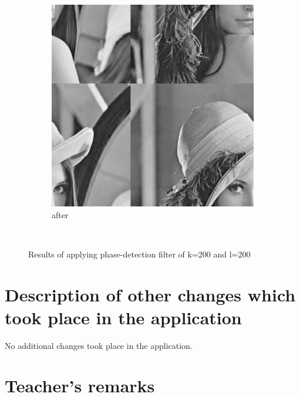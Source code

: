 \documentclass[12pt]{article}
\begin{document}
\begin{figure}[H]
\begin{subfigure}[t]{\subfiguresize}
        \includegraphics[width=\textwidth]{img/lena_phase.png}
        \caption{after}
    \end{subfigure}\\[1em]
    \caption{Results of applying phase-detection filter of k=200 and l=200}
\end{figure}  
\section{Description of other changes which took place in the application}

No additional changes took place in the application.

\vfill
\section*{Teacher's remarks}
\begin{tabularx}{\textwidth}{|X|}
    \hline
    \vspace{7cm}
    \phantom{.} \\
    \hline
\end{tabularx}
\end{document}
